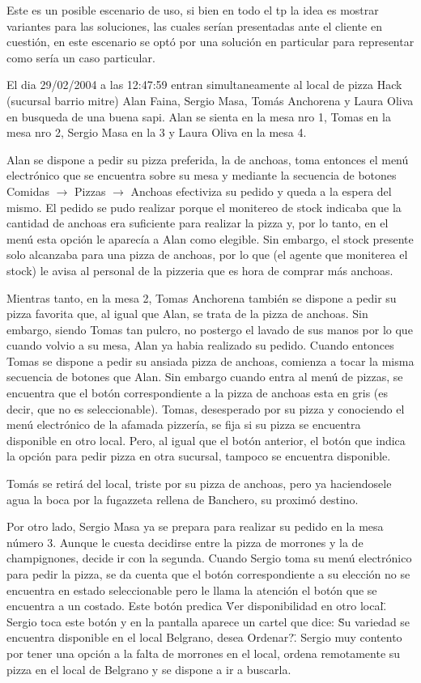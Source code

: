 \documentclass[a4paper,10pt]{article}
\begin{document}
Este es un posible escenario de uso, si bien en todo el tp la idea es mostrar variantes para las soluciones, las cuales ser\'ian presentadas 
ante el cliente en cuesti\'on, en este escenario se opt\'o por una soluci\'on en particular para representar como ser\'ia un caso particular.



El dia 29/02/2004 a las 12:47:59 entran simultaneamente al local de pizza Hack (sucursal barrio mitre) Alan Faina, 
Sergio Masa, Tom\'as Anchorena y Laura Oliva en busqueda de una buena sapi. 
Alan se sienta en la mesa nro 1, Tomas en la mesa nro 2, Sergio Masa en la 3 y Laura Oliva en la mesa 4. 

Alan se dispone a pedir su pizza preferida, la de anchoas, toma entonces el men\'u electr\'onico que se encuentra sobre su mesa y
mediante la secuencia de botones Comidas $\rightarrow$ Pizzas $\rightarrow$ Anchoas efectiviza su pedido y queda a la espera del mismo. El pedido se pudo 
realizar porque el monitereo de stock indicaba que la cantidad de anchoas era suficiente para realizar la pizza y, por lo tanto, en el men\'u
esta opci\'on le aparec\'ia a Alan como elegible. Sin embargo, el stock presente solo alcanzaba para una pizza de anchoas, por lo que (el agente
que moniterea el stock) le avisa al personal de la pizzeria que es hora de comprar m\'as anchoas.

Mientras tanto, en la mesa 2, Tomas Anchorena tambi\'en se dispone a pedir su pizza favorita que, al igual que Alan, se trata de la pizza de 
anchoas. Sin embargo, siendo Tomas tan pulcro, no postergo el lavado de sus manos por lo que cuando volvio a su mesa, Alan ya habia realizado
su pedido. Cuando entonces Tomas se dispone a pedir su ansiada pizza de anchoas, comienza a tocar la misma secuencia de botones que Alan. Sin embargo
cuando entra al men\'u de pizzas, se encuentra que el bot\'on correspondiente a la pizza de anchoas esta en gris (es decir, que no es seleccionable).
Tomas, desesperado por su pizza y conociendo el men\'u electr\'onico de la afamada pizzer\'ia, se fija si su pizza se encuentra disponible en otro
local. Pero, al igual que el bot\'on anterior, el bot\'on que indica la opci\'on para pedir pizza en otra sucursal, tampoco se encuentra disponible.

Tom\'as se retir\'a del local, triste por su pizza de anchoas, pero ya haciendosele agua la boca por la fugazzeta rellena de Banchero, su proxim\'o destino.

Por otro lado, Sergio Masa ya se prepara para realizar su pedido en la mesa n\'umero 3. Aunque le cuesta decidirse entre la pizza de morrones
y la de champignones, decide ir con la segunda. Cuando Sergio toma su men\'u electr\'onico para pedir la pizza, se da cuenta que el bot\'on 
correspondiente a su elecci\'on no se encuentra en estado seleccionable pero le llama la atenci\'on el bot\'on que se encuentra a un costado. Este
bot\'on predica \"Ver disponibilidad en otro local\". Sergio toca este bot\'on y en la pantalla aparece un cartel que dice: \"Su variedad se encuentra
disponible en el local Belgrano, desea Ordenar?\". Sergio muy contento por tener una opci\'on a la falta de morrones en el local, ordena remotamente su pizza
en el local de Belgrano y se dispone a ir a buscarla. 
\end{document}
